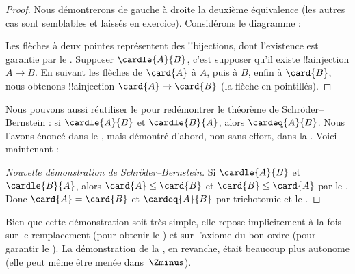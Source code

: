 \documentclass[../../../include/open-logic-section]{subfiles}
\begin{document}
\begin{proof}
Nous démontrerons de gauche à droite la deuxième
équivalence (les autres cas sont semblables et
laissés en exercice). Considérons le diagramme :
\begin{center}
\end{center}
Les flèches à deux pointes représentent des
!!{bijection}s, dont l'existence est garantie
par le . Supposer
$\cardle{A}{B}$, c'est supposer qu'il existe
!!a{injection} $A\to B$. En suivant les flèches
de $\card{A}$ à $A$, puis à $B$, enfin à
$\card{B}$, nous obtenons !!a{injection}
$\card{A} \to \card{B}$ (la flèche en pointillés).
\end{proof}\noindent
Nous pouvons aussi réutiliser
le  pour redémontrer
le théorème de Schröder--Bernstein : si
$\cardle{A}{B}$ et $\cardle{B}{A}$,
alors $\cardeq{A}{B}$. Nous l'avons énoncé
dans le
,
mais démontré d'abord, non sans effort, dans la
.
Voici maintenant :

\begin{proof}[Nouvelle démonstration de Schröder--Bernstein]
Si $\cardle{A}{B}$ et $\cardle{B}{A}$,
alors $\card{A} \leq \card{B}$ et
$\card{B} \leq \card{A}$ par le
. Donc
$\card{A} = \card{B}$ et
$\cardeq{A}{B}$ par trichotomie et le
.
\end{proof}
\noindent
Bien que cette démonstration soit très simple,
elle repose implicitement à la fois sur le
remplacement (pour obtenir
le )
et sur l'axiome du bon ordre (pour garantir
le ).
La démonstration de la
, en revanche,
était beaucoup plus autonome (elle peut même
être menée dans~$\Zminus$).
\end{document}
